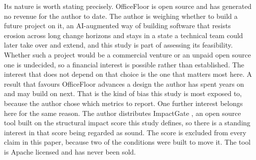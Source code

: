 \documentclass[11pt,a4paper]{article}
\begin{document}
Its nature is worth stating precisely. OfficeFloor is open source and has
generated no revenue for the author to date. The author is weighing whether to
build a future project on it, an AI-augmented way of building software that
resists erosion across long change horizons and stays in a state a technical team
could later take over and extend, and this study is part of assessing its
feasibility. Whether such a project would be a commercial venture or an unpaid
open source one is undecided, so a financial interest is possible rather than
established. The interest that does not depend on that choice is the one that
matters most here. A result that favours OfficeFloor advances a design the author
has spent years on and may build on next. That is the kind of bias this study is
most exposed to, because the author chose which metrics to report. One
further interest belongs here for the same reason. The author distributes
ImpactGate \cite{impactgate}, an open source tool built on the structural impact
score this study defines, so there is a standing interest in that score being
regarded as sound. The score is excluded from every claim in this paper, because
two of the conditions were built to move it. The tool is Apache licensed and has
never been sold.
\end{document}
